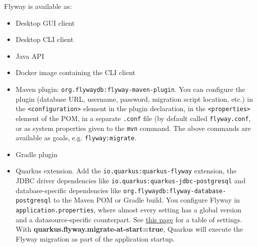 \documentclass[table, xcdraw]{article}%
\begin{document}
Flyway is available as:

\begin{itemize}
    \item Desktop GUI client
    \item Desktop CLI client
    \item Java API
    \item Docker image containing the CLI client
    \item Maven plugin: \texttt{org.flywaydb:flyway-maven-plugin}. You can configure the plugin (database URL, username, password, migration script location, etc.) in the \texttt{<configuration>} element in the plugin declaration, in the \texttt{<properties>} element of the POM, in a separate \texttt{.conf} file (by default called \texttt{flyway.conf}, or as system properties given to the \texttt{mvn} command. The above commands are available as goals, e.g. \texttt{flyway:migrate}.
    \item Gradle plugin
    \item Quarkus extension. Add the \texttt{io.quarkus:quarkus-flyway} extension, the JDBC driver dependencies like \texttt{io.quarkus:quarkus-jdbc-postgresql} and database-specific dependencies like \texttt{org.flywaydb:flyway-database-postgresql} to the Maven POM or Gradle build. You configure Flyway in \texttt{application.properties}, where almost every setting has a global version and a datasource-specific counterpart. See \href{https://quarkus.io/guides/flyway}{this page} for a table of settings. With \textbf{quarkus.flyway.migrate-at-start=true}, Quarkus will execute the Flyway migration as part of the application startup.
\end{itemize}
\end{document}
